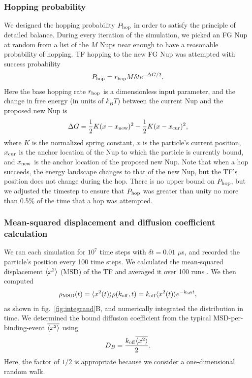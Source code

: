 \subsubsection{Hopping probability}

We designed the hopping probability $P_{\rm hop}$ in order to satisfy the principle of detailed balance.  During every iteration of the simulation, we picked an FG Nup at random from a list of the $M$  Nups near enough to have a reasonable probability of hopping. TF hopping to the new FG Nup was attempted with success probability
\begin{equation}
P_{\rm hop} = r_{\mathrm{hop}} M \delta t e^{-\Delta G /2}.
\end{equation}
Here the base hopping rate $r_{\mathrm{hop}}$ is a dimensionless input parameter, and the change in free energy (in units of $k_BT$) between the current Nup and the proposed new Nup is
\begin{equation}
  \Delta G = \frac{1}{2} K (x-x_{\mathrm{new}})^2 - \frac{1}{2} K (x -
  x_{\mathrm{cur}})^2,
\end{equation}
where $K$ is the normalized spring constant, $x$ is the particle's current position, $x_{\mathrm{cur}}$ is the anchor location of the Nup to which the particle is currently bound, and $x_{\mathrm{new}}$ is the anchor location of the proposed new Nup. Note that when a hop succeeds, the energy landscape changes to that of the new Nup, but the TF's position does not change during the hop.  There is no upper bound on $P_{\rm hop}$, but we adjusted the timestep to ensure that $P_{\rm hop}$ was greater than
unity no more than 0.5\% of the time that a hop was attempted.

\subsubsection{Mean-squared displacement and diffusion coefficient calculation}
We ran each simulation for $10^7$ time steps with $\delta t = 0.01$ $\mu$s, and recorded the particle's position every 100 time steps.  We calculated the mean-squared displacement $\langle x^2 \rangle$ (MSD) of the TF and averaged it over 100 runs .  We then computed
\begin{equation}
\rho_{\mathrm{MSD}} (t)= \langle x^2(t) \rangle \rho(k_{\rm off},t) = k_{\rm off} \langle x^2(t) \rangle
e^{-k_{\rm off} t}, 
\end{equation}
as shown in fig.~\ref{fig:integrand}B, and numerically integrated the distribution in time. We determined the bound diffusion coefficient from the typical MSD-per-binding-event $\overline{\langle x^2 \rangle}$ using
\begin{equation}
D_B = \frac{k_{\rm off} \overline{\langle x^2 \rangle}}{2}. 
\end{equation}   
Here, the factor of $1/2$ is appropriate because we consider a one-dimensional random walk.

